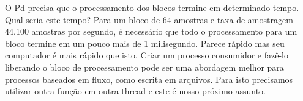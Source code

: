 O Pd precisa que o processamento dos blocos termine em determinado tempo. Qual
seria este tempo? Para um bloco de 64 amostras e taxa de amostragem 44.100
amostras por segundo, é necessário que todo o processamento para um bloco
termine em um pouco mais de 1 milisegundo. Parece rápido mas seu computador é
mais rápido que isto. Criar um processo consumidor e fazê-lo liberando
 o bloco de processamento pode ser uma abordagem
melhor para processos baseados em fluxo, como escrita em arquivos. Para isto
precisamos utilizar outra função em outra thread e este é nosso próximo
assunto.

